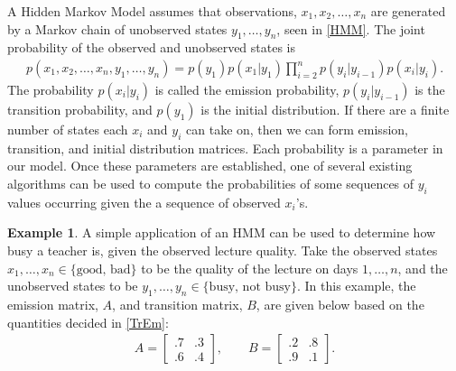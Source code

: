 \documentclass{article}
\numberwithin{equation}{section}
\theoremstyle{definition}
\newtheorem{example}[example]{Example}
\begin{document}


\noindent A Hidden Markov Model assumes that observations, $x_1,x_2,\dots,x_n$ are generated by a Markov chain of unobserved states $y_1,\dots,y_n$, seen in \autoref{HMM}. The joint probability of the observed and unobserved states is
\begin{align*}
    p(x_1,x_2,\dots,x_n,y_1,\dots,y_n) = p(y_1)p(x_1|y_1) \prod_{i=2}^n p(y_i|y_{i-1})p(x_i|y_i).
\end{align*}
The probability $p(x_i|y_i)$ is called the emission probability, $p(y_{i}|y_{i-1})$ is the transition probability, and $p(y_1)$ is the initial distribution. If there are a finite number of states each $x_i$ and $y_i$ can take on, then we can form emission, transition, and initial distribution matrices. Each probability is a parameter in our model. Once these parameters are established, one of several existing algorithms can be used to compute the  probabilities of some sequences of $y_i$ values occurring given the a sequence of observed $x_i$'s. 

\begin{example} \label{Transition and Emission probabilities}
A simple application of an HMM can be used to determine how busy a teacher is, given the observed lecture quality. Take the observed states $x_1,\dots,x_n\in \{\text{good, bad}\}$ to be the quality of the lecture on days $1,\dots, n$, and the unobserved states to be $y_1,\dots,y_n\in \{\text{busy, not busy}\}$. In this example, the emission matrix, $A$, and transition matrix, $B$, are given below based on the quantities decided in \autoref{TrEm}:
\begin{align*}
    A = \begin{bmatrix}
    .7 & .3 \\
    .6 & .4 
    \end{bmatrix} , \qquad 
     B = \begin{bmatrix}
    .2 & .8 \\
    .9 & .1
    \end{bmatrix}. 
\end{align*}
\end{example}
\end{document}
